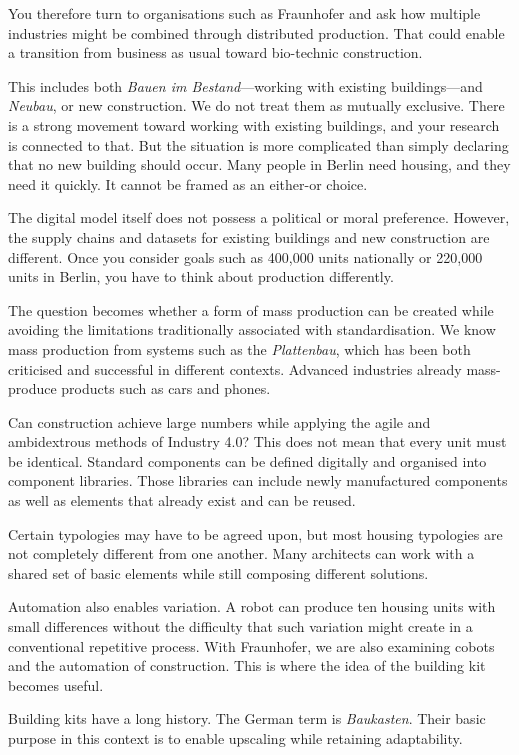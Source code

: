 You therefore turn to organisations such as Fraunhofer and ask how multiple industries might be combined through distributed production. That could enable a transition from business as usual toward bio-technic construction.

This includes both \textit{Bauen im Bestand}—working with existing buildings—and \textit{Neubau}, or new construction. We do not treat them as mutually exclusive. There is a strong movement toward working with existing buildings, and your research is connected to that. But the situation is more complicated than simply declaring that no new building should occur. Many people in Berlin need housing, and they need it quickly. It cannot be framed as an either-or choice.

The digital model itself does not possess a political or moral preference. However, the supply chains and datasets for existing buildings and new construction are different. Once you consider goals such as 400,000 units nationally or 220,000 units in Berlin, you have to think about production differently.

The question becomes whether a form of mass production can be created while avoiding the limitations traditionally associated with standardisation. We know mass production from systems such as the \textit{Plattenbau}, which has been both criticised and successful in different contexts. Advanced industries already mass-produce products such as cars and phones.

Can construction achieve large numbers while applying the agile and ambidextrous methods of Industry 4.0? This does not mean that every unit must be identical. Standard components can be defined digitally and organised into component libraries. Those libraries can include newly manufactured components as well as elements that already exist and can be reused.

Certain typologies may have to be agreed upon, but most housing typologies are not completely different from one another. Many architects can work with a shared set of basic elements while still composing different solutions.

Automation also enables variation. A robot can produce ten housing units with small differences without the difficulty that such variation might create in a conventional repetitive process. With Fraunhofer, we are also examining cobots and the automation of construction. This is where the idea of the building kit becomes useful.

Building kits have a long history. The German term is \textit{Baukasten}. Their basic purpose in this context is to enable upscaling while retaining adaptability.

